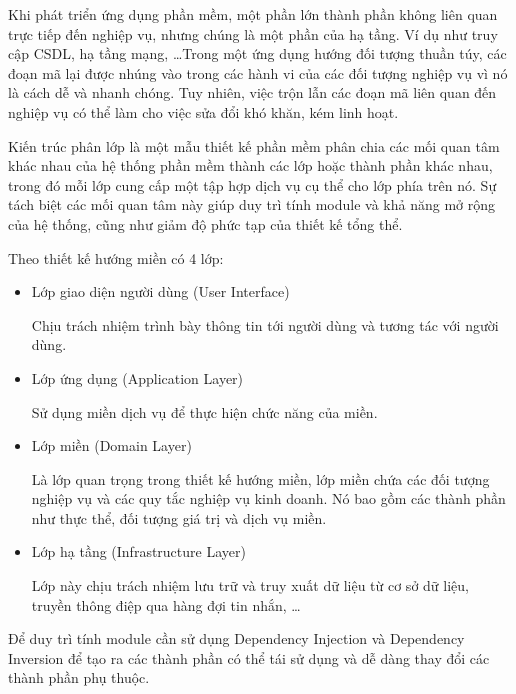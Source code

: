 



Khi phát triển ứng dụng phần mềm, một phần lớn thành phần không liên quan trực tiếp đến nghiệp vụ, nhưng chúng là một phần của hạ tầng. Ví dụ như truy cập CSDL, hạ tầng mạng, \dots Trong một ứng dụng hướng đối tượng thuần túy, các đoạn mã lại được nhúng vào trong các hành vi của các đối tượng nghiệp vụ vì nó là cách dễ và nhanh chóng. Tuy nhiên, việc trộn lẫn các đoạn mã liên quan đến nghiệp vụ có thể làm cho việc sửa đổi khó khăn, kém linh hoạt.

Kiến trúc phân lớp là một mẫu thiết kế phần mềm phân chia các mối quan tâm khác nhau của hệ thống phần mềm thành các lớp hoặc thành phần khác nhau, trong đó mỗi lớp cung cấp một tập hợp dịch vụ cụ thể cho lớp phía trên nó. Sự tách biệt các mối quan tâm này giúp duy trì tính module và khả năng mở rộng của hệ thống, cũng như giảm độ phức tạp của thiết kế tổng thể.

Theo thiết kế hướng miền có 4 lớp:

\begin{itemize}

\item Lớp giao diện người dùng (User Interface)

Chịu trách nhiệm trình bày thông tin tới người dùng và tương tác với người dùng.

\item Lớp ứng dụng (Application Layer)

Sử dụng miền dịch vụ để thực hiện chức năng của miền.

\item Lớp miền (Domain Layer)

Là lớp quan trọng trong thiết kế hướng miền, lớp miền chứa các đối tượng nghiệp vụ và các quy tắc nghiệp vụ kinh doanh. Nó bao gồm các thành phần như thực thể, đối tượng giá trị và dịch vụ miền.

\item Lớp hạ tầng (Infrastructure Layer)

Lớp này chịu trách nhiệm lưu trữ và truy xuất dữ liệu từ cơ sở dữ liệu, truyền thông điệp qua hàng đợi tin nhắn, \dots

\end{itemize}

\begin{example} Để duy trì tính module cần sử dụng Dependency Injection và Dependency Inversion để tạo ra các thành phần có thể tái sử dụng và dễ dàng thay đổi các thành phần phụ thuộc.

\end{example}